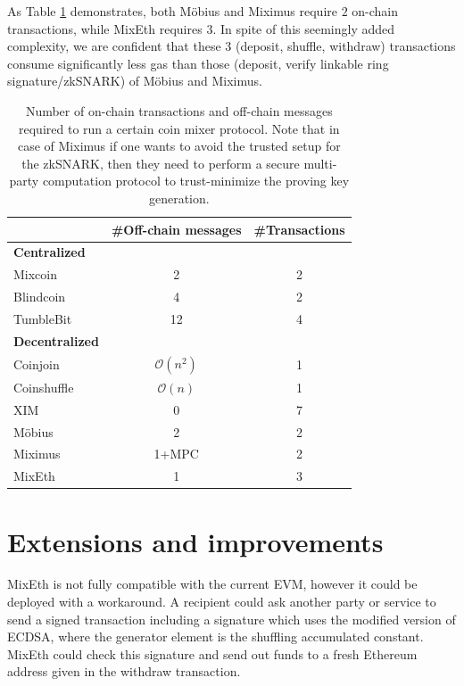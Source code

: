 \documentclass[a4paper]{article}
\theoremstyle{definition}
\begin{document}
As Table \ref{table:communicationcomplexity} demonstrates, both Möbius and Miximus require $2$ on-chain transactions, while MixEth requires $3$. In spite of this seemingly added complexity, we are confident that these 3 (deposit, shuffle, withdraw) transactions consume significantly less gas than those (deposit, verify linkable ring signature/zkSNARK) of Möbius and Miximus. 
\begin{table}[H] 
\caption{Number of on-chain transactions and off-chain messages required to run a certain coin mixer protocol. Note that in case of Miximus if one wants to avoid the trusted setup for the zkSNARK, then they need to perform a secure multi-party computation protocol to trust-minimize the proving key generation.}
\centering 
\begin{tabular}{lcc} 
	
	\toprule
	&\#Off-chain messages& \#Transactions \\
	\midrule
	\textbf{Centralized} & & \\
	\midrule
	Mixcoin \cite{bonneau2014mixcoin} & 2      & 2       \\
	Blindcoin \cite{valenta2015blindcoin} & 4      & 2       \\
	TumbleBit \cite{heilman2017tumblebit} & 12      & 4      \\
	\midrule
	\textbf{Decentralized}      &    &      \\
	\midrule
	Coinjoin \cite{maxwell2013coinjoin} &  $\mathcal{O}(n^2)$     & 1       \\
	Coinshuffle \cite{ruffing2014coinshuffle} &$\mathcal{O}(n)$       & 1       \\
	XIM \cite{bissias2014sybil} & 0      & 7       \\
	Möbius \cite{meiklejohn2018mobius} & 2    & 2       \\
	Miximus \cite{miximus2018} & 1+MPC & 2 \\
	MixEth & 1 & 3 \\
	\bottomrule
\end{tabular}
\label{table:communicationcomplexity}
\end{table}

\section{Extensions and improvements}
MixEth is not fully compatible with the current EVM, however it could be deployed with a workaround. A recipient could ask another party or service to send a signed transaction including a signature which uses the modified version of ECDSA, where the generator element is the shuffling accumulated constant. MixEth could check this signature and send out funds to a fresh Ethereum address given in the withdraw transaction. 
 
\end{document}
